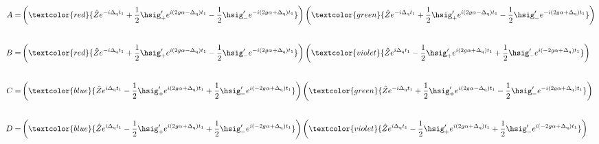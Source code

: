 \begin{align}
    A=&\left(\textcolor{red}{\hat{Z}e^{-i\Delta _{\rm{q}} t_1}
    +\frac{1}{2}\hsig_+^\prime e^{i(2g\alpha-\Delta _{\rm{q}}) t_1}
    -\frac{1}{2}\hsig_-^\prime e^{-i(2g\alpha+\Delta _{\rm{q}}) t_1}}\right)
    \left(\textcolor{green}{\hat{Z}e^{-i\Delta _{\rm{q}} t_1}
    +\frac{1}{2}\hsig_+^\prime e^{i(2g\alpha-\Delta _{\rm{q}}) t_1}
    -\frac{1}{2}\hsig_-^\prime e^{-i(2g\alpha+\Delta _{\rm{q}}) t_1}}\right)
    \\[20pt]
    B=&\left(\textcolor{red}{\hat{Z}e^{-i\Delta _{\rm{q}} t_1}
    +\frac{1}{2}\hsig_+^\prime e^{i(2g\alpha-\Delta _{\rm{q}}) t_1}
    -\frac{1}{2}\hsig_-^\prime e^{-i(2g\alpha+\Delta _{\rm{q}}) t_1}}\right)
    \left(\textcolor{violet}{
    \hat{Z}e^{i\Delta _{\rm{q}} t_1}
    -\frac{1}{2}\hsig_+^\prime e^{i(2g\alpha+\Delta _{\rm{q}}) t_1}
    +\frac{1}{2}\hsig_-^\prime e^{i(-2g\alpha+\Delta _{\rm{q}}) t_1}}\right)
    \\[20pt]
    C=&\left(\textcolor{blue}{
    \hat{Z}e^{i\Delta _{\rm{q}} t_1}
    -\frac{1}{2}\hsig_+^\prime e^{i(2g\alpha+\Delta _{\rm{q}}) t_1}
    +\frac{1}{2}\hsig_-^\prime e^{i(-2g\alpha+\Delta _{\rm{q}}) t_1}}\right)
    \left(\textcolor{green}{\hat{Z}e^{-i\Delta _{\rm{q}} t_1}
    +\frac{1}{2}\hsig_+^\prime e^{i(2g\alpha-\Delta _{\rm{q}}) t_1}
    -\frac{1}{2}\hsig_-^\prime e^{-i(2g\alpha+\Delta _{\rm{q}}) t_1}}\right)\\[20pt]
    D=&\left(\textcolor{blue}{
    \hat{Z}e^{i\Delta _{\rm{q}} t_1}
    -\frac{1}{2}\hsig_+^\prime e^{i(2g\alpha+\Delta _{\rm{q}}) t_1}
    +\frac{1}{2}\hsig_-^\prime e^{i(-2g\alpha+\Delta _{\rm{q}}) t_1}}\right)
    \left(\textcolor{violet}{
    \hat{Z}e^{i\Delta _{\rm{q}} t_1}
    -\frac{1}{2}\hsig_+^\prime e^{i(2g\alpha+\Delta _{\rm{q}}) t_1}
    +\frac{1}{2}\hsig_-^\prime e^{i(-2g\alpha+\Delta _{\rm{q}}) t_1}}\right)
\end{align}







